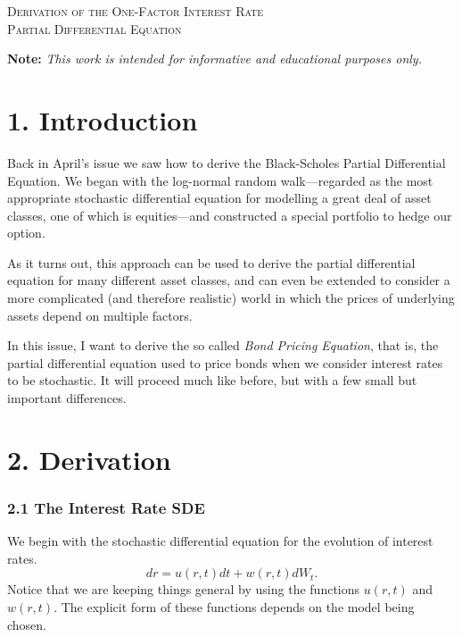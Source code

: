 \documentclass[11pt]{article}
\begin{document}

\begin{tcolorbox}
\begin{center}
    \large
    \textsc{Derivation of the One-Factor Interest Rate \\ Partial Differential Equation}
\end{center}
\end{tcolorbox}

\begin{center}
\textbf{Note:} \textit{This work is intended for informative and educational purposes only.}
\end{center}

\section*{1. Introduction}
Back in April's issue we saw how to derive the Black-Scholes Partial Differential Equation. We began with the log-normal random walk––regarded as the most appropriate stochastic differential equation for modelling a great deal of asset classes, one of which is equities––and constructed a special portfolio to hedge our option.

As it turns out, this approach can be used to derive the partial differential equation for many different asset classes, and can even be extended to consider a more complicated (and therefore realistic) world in which the prices of underlying assets depend on multiple factors.

In this issue, I want to derive the so called \textit{Bond Pricing Equation}, that is, the partial differential equation used to price bonds when we consider interest rates to be stochastic. It will proceed much like before, but with a few small but important differences. 

\section*{2. Derivation}
\subsubsection*{2.1 The Interest Rate SDE}
We begin with the stochastic differential equation for the evolution of interest rates.
\begin{equation}
    dr = u(r,t)dt + w(r,t)dW_t.
\end{equation}
Notice that we are keeping things general by using the functions $u(r,t)$ and $w(r,t)$. The explicit form of these functions depends on the model being chosen. 
\end{document}
